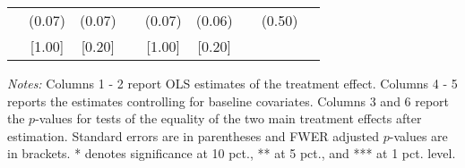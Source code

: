 \begin{table}[htbp]
{\begin{threeparttable}
\begin{tabular}{l*{8}{c}}
          &   (0.07)&   (0.07)&         &   (0.07)&   (0.06)&         &   (0.50)&         \\
          &   [1.00]&   [0.20]&         &   [1.00]&   [0.20]&         &         &         \\
\bottomrule \end{tabular} \begin{tablenotes}[flushleft] \footnotesize \item \emph{Notes:} Columns 1 - 2 report OLS estimates of the treatment effect. Columns 4 - 5 reports the estimates controlling for baseline covariates. Columns 3 and 6 report the \(p\)-values for tests of the equality of the two main treatment effects after estimation. Standard errors are in parentheses and FWER adjusted \(p\)-values are in brackets. * denotes significance at 10 pct., ** at 5 pct., and *** at 1 pct. level. \end{tablenotes} \end{threeparttable} } \end{table}

